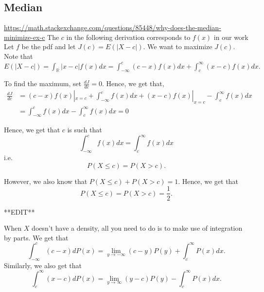 \documentclass{article}
\begin{document}
\subsection{Median}
\url{https://math.stackexchange.com/questions/85448/why-does-the-median-minimize-ex-c} The $c$ in the following derivation corresponds to $f(x)$ in our work\\

Let $f$ be the pdf and let $J(c) = E(|X-c|)$. We want to maximize $J(c)$. Note that $E(|X-c|) = \int_{\mathbb{R}} |x-c| f(x) dx = \int_{-\infty}^{c} (c-x) f(x) dx  + \int_c^{\infty} (x-c) f(x) dx.$

To find the maximum, set $\frac{dJ}{dc} = 0$. Hence, we get that,
\begin{align}
\frac{dJ}{dc} & = (c-x)f(x) | _{x=c} + \int_{-\infty}^{c} f(x) dx + (x-c)f(x) | _{x=c} - \int_c^{\infty} f(x) dx\\
& = \int_{-\infty}^{c} f(x) dx - \int_c^{\infty} f(x) dx = 0
\end{align}


Hence, we get that $c$ is such that $$\int_{-\infty}^{c} f(x) dx = \int_c^{\infty} f(x) dx$$ i.e. $$P(X \leq c) = P(X > c).$$

However, we also know that $P(X \leq c) + P(X > c) = 1$. Hence, we get that $$P(X \leq c) = P(X > c) = \frac12.$$

**EDIT**

When $X$ doesn't have a density, all you need to do is to make use of integration by parts. We get that $$\displaystyle \int_{-\infty}^{c} (c-x) dP(x) = \lim_{y \rightarrow -\infty} (c-y) P(y) + \displaystyle \int_{c}^{\infty} P(x) dx.$$ Similarly, we also get that $$\displaystyle \int_{c}^{\infty} (x-c) dP(x) = \lim_{y \rightarrow \infty} (y-c) P(y) - \displaystyle \int_{c}^{\infty} P(x) dx.$$
\end{document}
